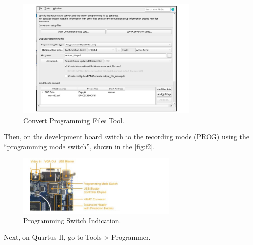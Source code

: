             \begin{figure}[!ht]
                \begin{center}
                    \includegraphics[width= 0.8\textwidth]{figures/chap2/fpga1.jpg}
                    \caption{\label{fig:f1} Convert Programming Files Tool.}
                \end{center}
            \end{figure}        
            
        Then, on the development board switch to the recording mode (PROG) using the ``programming mode switch'', shown in the \autoref{fig:f2}.
        
            \begin{figure}[!ht]
                \begin{center}
                    \includegraphics[width= 0.7\textwidth]{figures/chap2/fpga2.jpg}
                    \caption{\label{fig:f2} Programming Switch Indication.}
                \end{center}
            \end{figure}
        
        Next, on Quartus II, go to Tools > Programmer.
            
